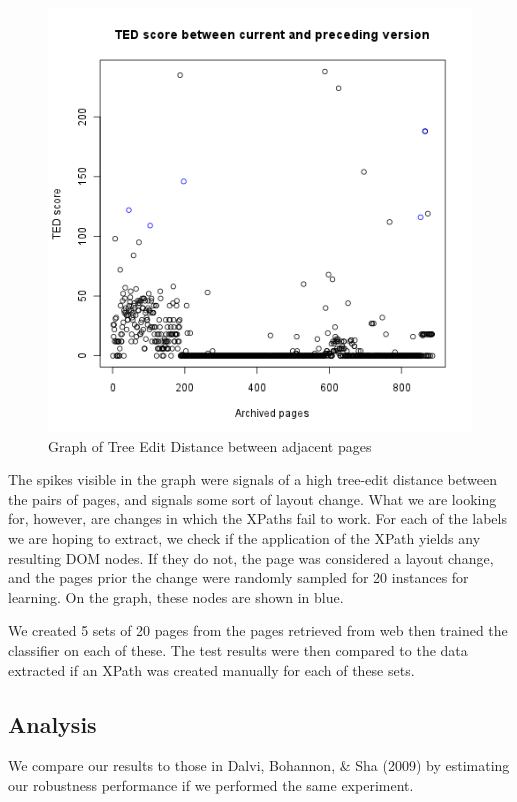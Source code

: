 \begin{figure}[htbp]
\centering
\includegraphics[scale=0.6]{scoregraph.png} 
\caption{Graph of Tree Edit Distance between adjacent pages}
\label{fig:scoregraph}
\end{figure}

	The spikes visible in the graph were signals of a high tree-edit distance between the pairs
of pages, and signals some sort of layout change. What we are looking for, however, are changes
in which the XPaths fail to work. For each of the labels we are hoping to extract, we check
if the application of the XPath yields any resulting DOM nodes. If they do not, the page was
considered a layout change, and the pages prior the change were randomly sampled for 20 instances
for learning. On the graph, these nodes are shown in blue.

	 We created 5 sets of 20 pages from the pages retrieved from web
then trained the classifier on each of these. The test results were then compared to the data
extracted if an XPath was created manually for each of these sets.
 
 
\subsection{Analysis}
We compare our results to those in Dalvi, Bohannon, \& Sha (2009) by estimating our
robustness performance if we performed the same experiment.

